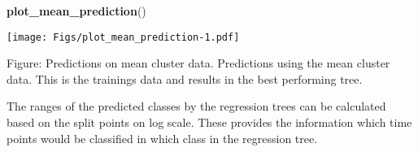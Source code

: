 \documentclass[]{article}
\newenvironment{Shaded}{\begin{snugshade}}{\end{snugshade}}
\newcommand{\KeywordTok}[1]{\textcolor[rgb]{0.13,0.29,0.53}{\textbf{{#1}}}}
\newcommand{\NormalTok}[1]{{#1}}
\begin{document}
\begin{Shaded}
\begin{Highlighting}[]
\KeywordTok{plot_mean_prediction}\NormalTok{()}
\end{Highlighting}
\end{Shaded}

\texttt{[image: Figs/plot\_mean\_prediction-1.pdf]}

Figure: Predictions on mean cluster data. Predictions using the mean
cluster data. This is the trainings data and results in the best
performing tree.

The ranges of the predicted classes by the regression trees can be
calculated based on the split points on log scale. These provides the
information which time points would be classified in which class in the
regression tree.
\end{document}
